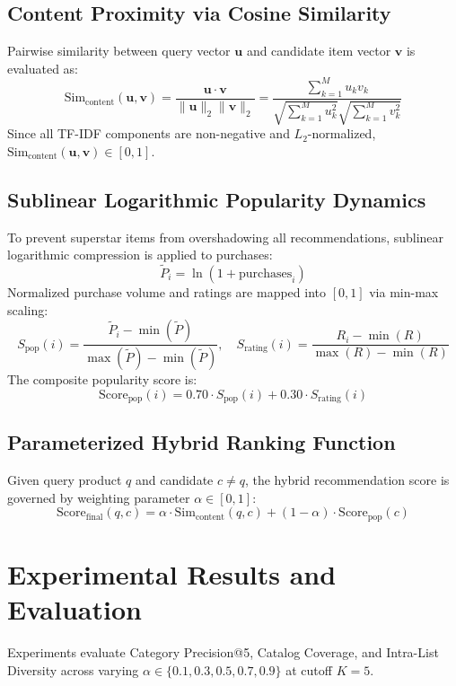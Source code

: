 \documentclass[conference]{IEEEtran}
\begin{document}
\subsection{Content Proximity via Cosine Similarity}
Pairwise similarity between query vector $\mathbf{u}$ and candidate item vector $\mathbf{v}$ is evaluated as:
\begin{equation}
\text{Sim}_{\text{content}}(\mathbf{u}, \mathbf{v}) = \frac{\mathbf{u} \cdot \mathbf{v}}{\|\mathbf{u}\|_2 \|\mathbf{v}\|_2} = \frac{\sum_{k=1}^M u_k v_k}{\sqrt{\sum_{k=1}^M u_k^2} \sqrt{\sum_{k=1}^M v_k^2}}
\end{equation}
Since all TF-IDF components are non-negative and $L_2$-normalized, $\text{Sim}_{\text{content}}(\mathbf{u}, \mathbf{v}) \in [0, 1]$.

\subsection{Sublinear Logarithmic Popularity Dynamics}
To prevent superstar items from overshadowing all recommendations, sublinear logarithmic compression is applied to purchases:
\begin{equation}
\tilde{P}_i = \ln(1 + \text{purchases}_i)
\end{equation}
Normalized purchase volume and ratings are mapped into $[0, 1]$ via min-max scaling:
\begin{equation}
S_{\text{pop}}(i) = \frac{\tilde{P}_i - \min(\tilde{P})}{\max(\tilde{P}) - \min(\tilde{P})}, \quad S_{\text{rating}}(i) = \frac{R_i - \min(R)}{\max(R) - \min(R)}
\end{equation}
The composite popularity score is:
\begin{equation}
\text{Score}_{\text{pop}}(i) = 0.70 \cdot S_{\text{pop}}(i) + 0.30 \cdot S_{\text{rating}}(i)
\end{equation}

\subsection{Parameterized Hybrid Ranking Function}
Given query product $q$ and candidate $c \neq q$, the hybrid recommendation score is governed by weighting parameter $\alpha \in [0, 1]$:
\begin{equation}
\text{Score}_{\text{final}}(q, c) = \alpha \cdot \text{Sim}_{\text{content}}(q, c) + (1 - \alpha) \cdot \text{Score}_{\text{pop}}(c)
\end{equation}

\section{Experimental Results and Evaluation}
Experiments evaluate Category Precision@5, Catalog Coverage, and Intra-List Diversity across varying $\alpha \in \{0.1, 0.3, 0.5, 0.7, 0.9\}$ at cutoff $K = 5$.
\end{document}
